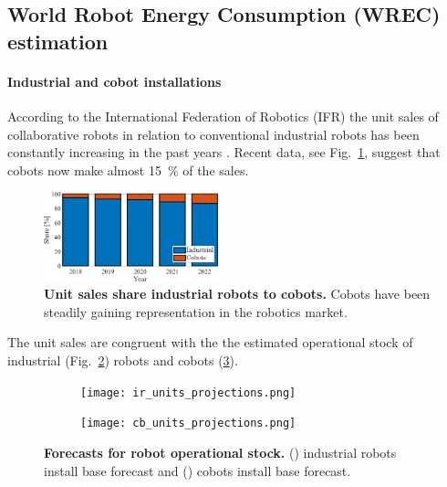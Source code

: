 \subsection{World Robot Energy Consumption (WREC) estimation}\label{sec:app_robot_ener_consumption}

\paragraph{Industrial and cobot installations}\label{sec:robot_statistics}
According to the International Federation of Robotics (IFR) the unit sales of collaborative robots in relation to conventional industrial robots has been constantly increasing in the past years \cite{statista_ir_cobot_share}. Recent data, see Fig.~\ref{fig:industrial_cobot_share}, suggest that cobots now make almost 15~\% of the sales.
\begin{figure}[!h]
	\centering
	\includegraphics[width= 0.45\textwidth]{fig/share_industrial_and_cobots.png} 
	\caption{\textbf{Unit sales share industrial robots to cobots.} Cobots have been steadily gaining representation in the robotics market.}
	\label{fig:industrial_cobot_share}
\end{figure}

The unit sales are congruent with the the estimated operational stock of industrial (Fig.~\ref{fig:ir_stock}) robots and cobots (\ref{fig:cobot_stock}).
\begin{figure}[t!]
	\centering
	\hspace*{\fill}
	\begin{subfigure}[b]{0.45\textwidth}
		\subcaption{}
		\texttt{[image: ir\_units\_projections.png]}
		\label{fig:ir_stock}
	\end{subfigure}
	\hfill
	\begin{subfigure}[b]{0.45\textwidth}
		\subcaption{}
		\texttt{[image: cb\_units\_projections.png]}
		\label{fig:cobot_stock}
	\end{subfigure}
	\hspace*{\fill}	
	\caption[] {\label{fig:robot_forecasts} \textbf{Forecasts for robot operational stock.} () industrial robots install base forecast and () cobots install base forecast.}	
\end{figure}


